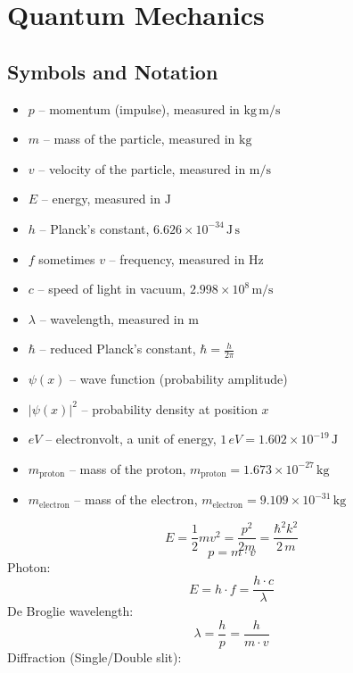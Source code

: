 \section{Quantum Mechanics}
\subsection{Symbols and Notation}
\begin{itemize}
    \item $p$ -- momentum (impulse), measured in $\mathrm{kg\,m/s}$
    \item $m$ -- mass of the particle, measured in $\mathrm{kg}$
    \item $v$ -- velocity of the particle, measured in $\mathrm{m/s}$
    \item $E$ -- energy, measured in $\mathrm{J}$
    \item $h$ -- Planck's constant, $6.626 \times 10^{-34}\,\mathrm{J\,s}$
    \item $f$ sometimes $v$ -- frequency, measured in $\mathrm{Hz}$
    \item $c$ -- speed of light in vacuum, $2.998 \times 10^8\,\mathrm{m/s}$
    \item $\lambda$ -- wavelength, measured in $\mathrm{m}$
    \item $\hbar$ -- reduced Planck's constant, $\hbar = \frac{h}{2\pi}$
    \item $\psi(x)$ -- wave function (probability amplitude)
    \item $|\psi(x)|^2$ -- probability density at position $x$
    \item \(eV\) -- electronvolt, a unit of energy, \(1\,eV = 1.602 \times 10^{-19}\,\mathrm{J}\)
    \item \(m_{\text{proton}}\) -- mass of the proton, \(m_{\text{proton}} = 1.673 \times 10^{-27}\,\mathrm{kg}\)
    \item \(m_{\text{electron}}\) -- mass of the electron, \(m_{\text{electron}} = 9.109 \times 10^{-31}\,\mathrm{kg}\)
\end{itemize}
\[
E = \frac{1}{2} m v^2 = \frac{p^2}{2m} = \frac{\hbar^2k^2}{2\,m}
\]
\begin{equation*}
    p = m \cdot v
\end{equation*}
Photon:
\begin{equation*}
    E = h \cdot f = \frac{h \cdot c}{\lambda}
\end{equation*}
De Broglie wavelength:
\begin{equation*}
    \lambda = \frac{h}{p} = \frac{h}{m \cdot v}
\end{equation*}
Diffraction (Single/Double slit):

